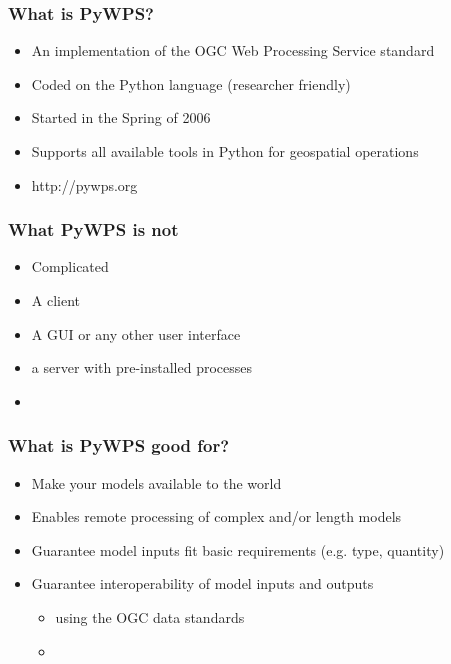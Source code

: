 \documentclass{beamer}
\begin{document}
\begin{frame}
\frametitle{What is PyWPS?}

\begin{itemize}
  \item An implementation of the OGC Web Processing Service
standard
\item Coded on the Python language (researcher friendly)
\item Started in the Spring of 2006
\item Supports all available tools in Python for geospatial operations
\item http://pywps.org
  
\end{itemize}
\end{frame}


\begin{frame}
\frametitle{What PyWPS is not}

\begin{itemize}
  \item Complicated
  \item A client
  \item A GUI or any other user interface
  \item a server with pre-installed processes
  \item 
  
\end{itemize}
\end{frame}



\begin{frame}
\frametitle{What is PyWPS good for?}

\begin{itemize}
  \item Make your models available to the world
  \item Enables remote processing of complex and/or length models 
  \item Guarantee model inputs fit basic requirements (e.g. type, quantity)
  \item Guarantee interoperability of model inputs and outputs
  \begin{itemize}
    \item using the OGC data standards
	\item 
  \end{itemize}
\end{itemize}
\end{frame}
\end{document}
